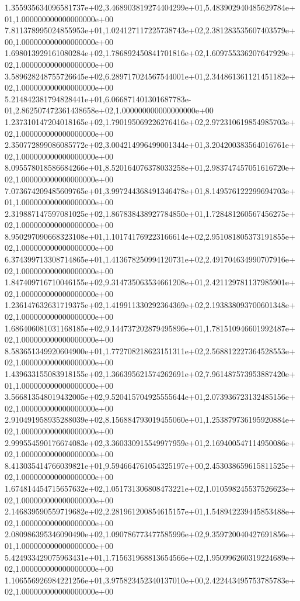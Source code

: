 1.355935634096581737e+02,3.468903819274404299e+01,5.483902940485629784e+01,1.000000000000000000e+00
7.811378995024855953e+01,1.024127117225738743e+02,2.381283535607403579e+00,1.000000000000000000e+00
1.698013929161080284e+02,1.786892450841701816e+02,1.609755336207647929e+02,1.000000000000000000e+00
3.589628248755726645e+02,6.289717024567544001e+01,2.344861361121451182e+02,1.000000000000000000e+00
5.214842381794828441e+01,6.066871401301687783e-01,2.862507472361438658e+02,1.000000000000000000e+00
1.237310147204018165e+02,1.790195069226276416e+02,2.972310619854985703e+02,1.000000000000000000e+00
2.350772899086085772e+02,3.004214996499001344e+01,3.204200383564016761e+02,1.000000000000000000e+00
8.095578018586684266e+01,8.520164076378033258e+01,2.983747457051616720e+02,1.000000000000000000e+00
7.073674209485609765e+01,3.997244368491346478e+01,8.149576122299694703e+01,1.000000000000000000e+00
2.319887147597081025e+02,1.867838438927784850e+01,1.728481260567456275e+02,1.000000000000000000e+00
8.950297090668323108e+01,1.101741769223166614e+02,2.951081805373191855e+02,1.000000000000000000e+00
6.374399713308714865e+01,1.413678250994120731e+02,2.491704634990707916e+02,1.000000000000000000e+00
1.847409716710046155e+02,9.314735063534661208e+01,2.421129781137985901e+02,1.000000000000000000e+00
1.236147632631719375e+02,1.419911330292364369e+02,2.193838093700601348e+02,1.000000000000000000e+00
1.686406081031168185e+02,9.144737202879495896e+01,1.781510946601992487e+02,1.000000000000000000e+00
8.583651349920604900e+01,1.772708218623151311e+02,2.568812227364528553e+02,1.000000000000000000e+00
1.439633155083918155e+02,1.366395621574262691e+02,7.961487573953887420e+01,1.000000000000000000e+00
3.566813548019432005e+02,9.520415704925555644e+01,2.073936723132485156e+02,1.000000000000000000e+00
2.910491958935288039e+02,8.156884793019455060e+01,1.253879736195920884e+02,1.000000000000000000e+00
2.999554590176674083e+02,3.360330915549977959e+01,2.169400547114950086e+02,1.000000000000000000e+00
8.413035414766039821e+01,9.594664761054325197e+00,2.453038659615811525e+02,1.000000000000000000e+00
1.674814454715657632e+02,1.051731306808473221e+02,1.010598245537526623e+02,1.000000000000000000e+00
2.146839590559719682e+02,2.281961200854615157e+01,1.548942239445853488e+02,1.000000000000000000e+00
2.080986395346090490e+02,1.090786773477585996e+02,9.359720040427691856e+01,1.000000000000000000e+00
5.424933429075963431e+01,1.715631968813654566e+02,1.950996260319224689e+02,1.000000000000000000e+00
1.106556926984221256e+01,3.975823452340137010e+00,2.422443495753785783e+02,1.000000000000000000e+00
